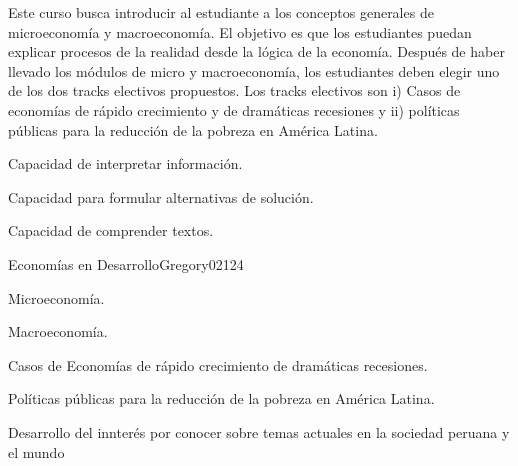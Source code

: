 \begin{syllabus}


\begin{justification}
Este curso busca introducir al estudiante a los conceptos generales de microeconomía y macroeconomía. El objetivo es que los estudiantes puedan explicar procesos de la realidad desde la lógica de la economía. Después de haber llevado los módulos de micro y macroeconomía, los estudiantes deben elegir uno de los dos tracks electivos propuestos.
Los tracks electivos son i) Casos de economías de rápido crecimiento y de dramáticas recesiones y ii) políticas públicas para la reducción de la pobreza en América Latina.
\end{justification}

\begin{goals}
\item Capacidad de interpretar información.
\item Capacidad para formular alternativas de solución.
\item Capacidad de comprender textos.
\end{goals}

\begin{outcomes}
    \item {} %
    \item {} %
    \item {} %
    \item {} %

\end{outcomes}

\begin{competences}
    \item {}
    \item {}
    \item {}
    \item {}
\end{competences}

\begin{unit}{Economías en Desarrollo}{}{Gregory02}{12}{4}
   \begin{topics}
      \item Microeconomía.
      \item Macroeconomía.
      \item Casos de Economías de rápido crecimiento de dramáticas recesiones.
      \item Políticas públicas para la reducción de la pobreza en América Latina.
   \end{topics}
   \begin{learningoutcomes}
      \item Desarrollo del innterés por conocer sobre temas actuales en la sociedad peruana y el mundo
   \end{learningoutcomes}
\end{unit}




\end{syllabus}
